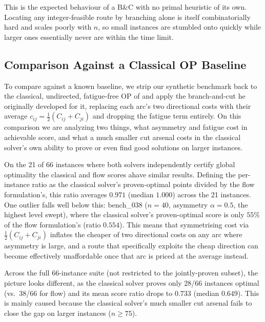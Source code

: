 \documentclass[11pt,a4paper]{article}
\begin{document}
This is the expected behaviour of a B\&C with no primal heuristic of its own. Locating any integer-feasible route by branching alone is itself combinatorially hard and scales poorly with $n$, so small instances are stumbled onto quickly while larger ones essentially never are within the time limit.

\subsection{Comparison Against a Classical OP Baseline}
\label{sec:classical_baseline}

To compare against a known baseline, we strip our synthetic benchmark back to the classical, undirected, fatigue-free OP of \citet{fischetti1998solving} and apply the branch-and-cut he originally developed for it, replacing each arc's two directional costs with their average $c_{ij} = \tfrac{1}{2}(C_{ij} + C_{ji})$ and dropping the fatigue term entirely.
On this comparison we are analyzing two things, what asymmetry and fatigue cost in achievable score, and what a much smaller cut arsenal costs in the classical solver's own ability to prove or even find good solutions on larger instances.

On the 21 of 66 instances where both solvers independently certify global optimality the classical and flow scores ahave similar results. Defining the per-instance ratio as the classical solver's proven-optimal points divided by the flow formulation's, this ratio averages $0.971$ (median $1.000$) across the 21 instances.
One outlier falls well below this: bench\_038 ($n=40$, asymmetry $\alpha = 0.5$, the highest level swept), where the classical solver's proven-optimal score is only $55\%$ of the flow formulation's (ratio $0.554$).
This means that symmetrising cost via $\tfrac{1}{2}(C_{ij}+C_{ji})$ inflates the cheaper of two directional costs on any arc where asymmetry is large, and a route that specifically exploits the cheap direction can become effectively unaffordable once that arc is priced at the average instead.

Across the full 66-instance suite (not restricted to the jointly-proven subset), the picture looks different, as the classical solver proves only 28/66 instances optimal (vs.\ 38/66 for flow) and its mean score ratio drops to $0.733$ (median $0.649$).
This is mainly caused because the classical solver's much smaller cut arsenal fails to close the gap on larger instances ($n \geq 75$).

\end{document}
